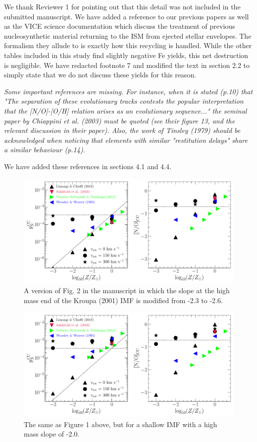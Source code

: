 \documentclass[12pt]{article}
\newcommand\doublebreak[0]{\par\null\par\noindent}
\begin{document}
\doublebreak
We thank Reviewer 1 for pointing out that this detail was not included in the
submitted manuscript.
We have added a reference to our previous papers as well as the VICE science
documentation which discuss the treatment of previous nucleosynthetic material
returning to the ISM from ejected stellar envelopes.
The formalism they allude to is exactly how this recycling is handled.
While the other tables included in this study find slightly negative Fe yields,
this net destruction is negligible.
We have redacted footnote 7 and modified the text in section 2.2 to simply
state that we do not discuss these yields for this reason.
\doublebreak
\textit{%
Some important references are missing. For instance, when it is stated (p.10)
that "The separation of these evolutionary tracks contests the popular
interpretation that the [N/O]-[O/H] relation arises as an evolutionary
sequence..." the seminal paper by Chiappini et al. (2003) must be quoted (see
their figure 13, and the relevant discussion in their paper). Also, the work of
Tinsley (1979) should be acknowledged when noticing that elements with similar
"restitution delays" share a similar behaviour (p.14).
}
\doublebreak
We have added these references in sections 4.1 and 4.4.

\newpage
\begin{figure}[!h]
\centering
\includegraphics[scale = 0.6]{n_cc_yields_steep.pdf}
\caption{
A version of Fig. 2 in the manuscript in which the slope at the high mass end
of the Kroupa (2001) IMF is modified from -2.3 to -2.6.
}
\end{figure}
\begin{figure}[!h]
\centering
\includegraphics[scale = 0.6]{n_cc_yields_shallow.pdf}
\caption{
The same as Figure 1 above, but for a shallow IMF with a high mass slope of
-2.0.
}
\end{figure}
\end{document}
